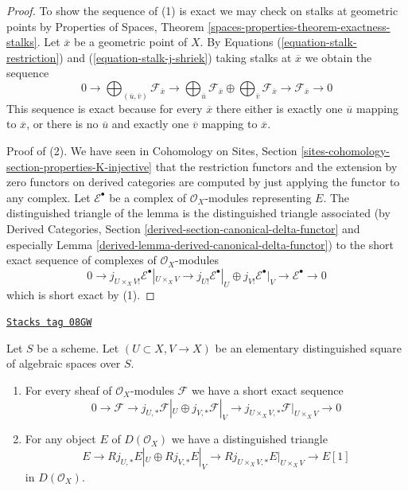 \begin{proof}
To show the sequence of (1) is exact we may check on stalks at
geometric points by
Properties of Spaces, Theorem
\ref{spaces-properties-theorem-exactness-stalks}.
Let $\overline{x}$ be a geometric point of $X$. By Equations
(\ref{equation-stalk-restriction}) and (\ref{equation-stalk-j-shriek})
taking stalks at $\overline{x}$ we obtain the sequence
$$
0 \to
\bigoplus\nolimits_{(\overline{u}, \overline{v})} \mathcal{F}_{\overline{x}}
\to
\bigoplus\nolimits_{\overline{u}} \mathcal{F}_{\overline{x}}
\oplus
\bigoplus\nolimits_{\overline{v}} \mathcal{F}_{\overline{x}}
\to
\mathcal{F}_{\overline{x}} \to 0
$$
This sequence is exact because for every $\overline{x}$
there either is exactly one $\overline{u}$ mapping to $\overline{x}$,
or there is no $\overline{u}$ and exactly one $\overline{v}$
mapping to $\overline{x}$.

\medskip\noindent
Proof of (2). We have seen in Cohomology on Sites, Section
\ref{sites-cohomology-section-properties-K-injective}
that the restriction functors and the extension by zero functors
on derived categories are computed by just applying the functor
to any complex. Let $\mathcal{E}^\bullet$ be a complex
of $\mathcal{O}_X$-modules representing $E$.
The distinguished triangle of the lemma is the
distinguished triangle associated (by
Derived Categories, Section
\ref{derived-section-canonical-delta-functor} and especially
Lemma \ref{derived-lemma-derived-canonical-delta-functor})
to the short exact sequence of complexes of $\mathcal{O}_X$-modules
$$
0 \to j_{U \times_X V!}\mathcal{E}^\bullet|_{U \times_X V} \to
j_{U!}\mathcal{E}^\bullet|_U \oplus j_{V!}\mathcal{E}^\bullet|_V
\to \mathcal{E}^\bullet \to 0
$$
which is short exact by (1).
\end{proof}

\begin{lemma}
\label{spaces-perfect-lemma-exact-sequence-j-star}
\href{https://stacks.math.columbia.edu/tag/08GW}{\texttt{Stacks tag 08GW}}

Let $S$ be a scheme. Let $(U \subset X, V \to X)$ be an elementary
distinguished square of algebraic spaces over $S$.
\begin{enumerate}
\item For every sheaf of $\mathcal{O}_X$-modules $\mathcal{F}$
we have a short exact sequence
$$
0 \to \mathcal{F} \to
j_{U, *}\mathcal{F}|_U \oplus j_{V, *}\mathcal{F}|_V \to
j_{U \times_X V, *}\mathcal{F}|_{U \times_X V} \to 0
$$
\item For any object $E$ of $D(\mathcal{O}_X)$ we have a distinguished
triangle
$$
E \to
Rj_{U, *}E|_U \oplus Rj_{V, *}E|_V \to
Rj_{U \times_X V, *}E|_{U \times_X V} \to
E[1]
$$
in $D(\mathcal{O}_X)$.
\end{enumerate}
\end{lemma}

